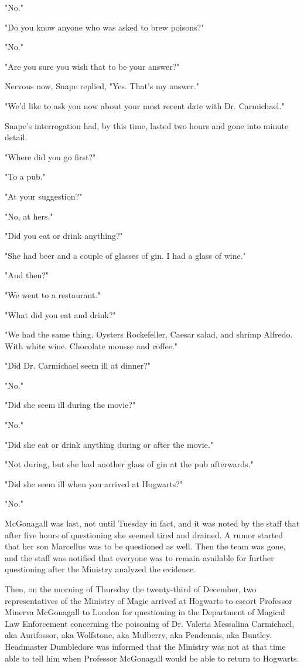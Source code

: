\documentclass[a4paper,11pt]{article}
\begin{document}
"No."

"Do you know anyone who was asked to brew poisons?"

"No."

"Are you sure you wish that to be your answer?"

Nervous now, Snape replied, "Yes. That's my answer."

"We'd like to ask you now about your most recent date with Dr. Carmichael."

Snape's interrogation had, by this time, lasted two hours and gone into minute detail.

"Where did you go first?"

"To a pub."

"At your suggestion?"

"No, at hers."

"Did you eat or drink anything?"

"She had beer and a couple of glasses of gin. I had a glass of wine."

"And then?"

"We went to a restaurant."

"What did you eat and drink?"

"We had the same thing. Oysters Rockefeller, Caesar salad, and shrimp Alfredo. With white wine. Chocolate mousse and coffee."

"Did Dr. Carmichael seem ill at dinner?"

"No."

"Did she seem ill during the movie?"

"No."

"Did she eat or drink anything during or after the movie."

"Not during, but she had another glass of gin at the pub afterwards."

"Did she seem ill when you arrived at Hogwarts?"

"No."

McGonagall was last, not until Tuesday in fact, and it was noted by the staff that after five hours of questioning she seemed tired and drained. A rumor started that her son Marcellus was to be questioned as well. Then the team was gone, and the staff was notified that everyone was to remain available for further questioning after the Ministry analyzed the evidence.

Then, on the morning of Thursday the twenty-third of December, two representatives of the Ministry of Magic arrived at Hogwarts to escort Professor Minerva McGonagall to London for questioning in the Department of Magical Law Enforcement concerning the poisoning of Dr. Valeria Messalina Carmichael, aka Aurifossor, aka Wolfstone, aka Mulberry, aka Pendennis, aka Buntley. Headmaster Dumbledore was informed that the Ministry was not at that time able to tell him when Professor McGonagall would be able to return to Hogwarts.
\end{document}
